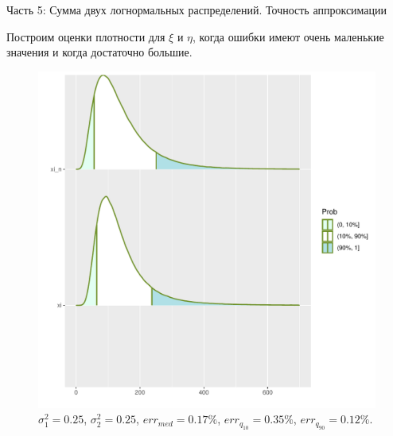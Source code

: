 \documentclass[ucs, notheorems, handout]{beamer}
\begin{document}
	\begin{frame}{Часть 5: Сумма двух логнормальных распределений. Точность аппроксимации}
		
		Построим оценки плотности для $\xi$ и $\eta$, когда ошибки имеют очень маленькие значения и когда достаточно большие.
		
		\begin{figure}[h]
			\begin{center}
				\begin{minipage}[h]{0.4\linewidth}
					\includegraphics[width=1\linewidth]{img/sr1.pdf}
					\caption{$\sigma_{1}^{2} = 0.25$, $\sigma_{2}^{2} = 0.25$, $err_{med} = 0.17\%$,  $err_{q_{10}} = 0.35\%$,  $err_{q_{90}} = 0.12\%$. } %
					\label{ris7} %
				\end{minipage}
				
			\end{center}
		\end{figure}
	
		
	\end{frame}
	
\end{document}

